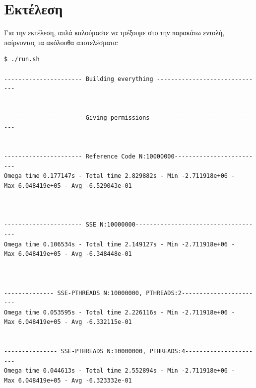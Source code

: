 \documentclass{article}
\begin{document}
\section{Εκτέλεση}

Για την εκτέλεση, απλά καλούμαστε να τρέξουμε στο  την παρακάτω εντολή, παίρνοντας τα ακόλουθα
αποτελέσματα:
\vspace{10mm}
\begin{commandline}
	\begin{verbatim}
$ ./run.sh

---------------------- Building everything ------------------------------


---------------------- Giving permissions -------------------------------


---------------------- Reference Code N:10000000-------------------------
Omega time 0.177147s - Total time 2.829882s - Min -2.711918e+06 - 
Max 6.048419e+05 - Avg -6.529043e-01



---------------------- SSE N:10000000------------------------------------
Omega time 0.106534s - Total time 2.149127s - Min -2.711918e+06 - 
Max 6.048419e+05 - Avg -6.348448e-01



-------------- SSE-PTHREADS N:10000000, PTHREADS:2-----------------------
Omega time 0.053595s - Total time 2.226116s - Min -2.711918e+06 - 
Max 6.048419e+05 - Avg -6.332115e-01


--------------- SSE-PTHREADS N:10000000, PTHREADS:4----------------------
Omega time 0.044613s - Total time 2.552894s - Min -2.711918e+06 - 
Max 6.048419e+05 - Avg -6.323332e-01
      \end{verbatim}
\end{commandline}
\end{document}

